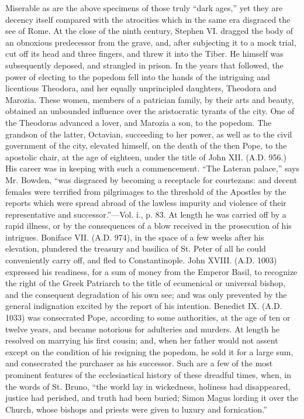 Miserable as are the above specimens of those
truly ``dark ages,'' yet they are decency itself compared with the
atrocities which in the same era disgraced the see of Rome. At the
close of the ninth century, Stephen VI. dragged the body of an
obnoxious predecessor from the grave, and, after subjecting it to a
mock trial, cut off its head and three fingers, and threw it into the
Tiber. He himself was subsequently deposed, and strangled in prison.
In the years that followed, the power of electing to the popedom fell
into the hands of the intriguing and licentious Theodora, and her
equally unprincipled daughters, Theodora and Marozia. These women,
members of a patrician family, by their arts and beauty, obtained an
unbounded influence over the aristocratic tyrants of the city. One of
the Theodoras advanced a lover, and Marozia a son, to the popedom. The
grandson of the latter, Octavian, succeeding to her power, as well as
to the civil government of the city, elevated himself, on the death of
the then Pope, to the apostolic chair, at the age of eighteen, under
the title of John XII. (A.D.
956.) His career was in keeping with such a commencement. ``The Lateran
palace,'' says Mr. Bowden, ``was disgraced by becoming a receptacle for
courtezans: and decent females were terrified from pilgrimages to the
threshold of the Apostles by the reports which were spread abroad
of the lawless impurity and violence of their representative and
successor.''—Vol. i., p. 83. At length he was carried off by a rapid
illness, or by the consequences of a blow received in the prosecution
of his intrigues. Boniface VII. (A.D.
974), in the space of a few weeks after his elevation, plundered the
treasury and basilica of St. Peter of all he could conveniently carry
off, and fled to Constantinople. John XVIII. (A.D.
1003) expressed his readiness, for a sum of money from the Emperor
Basil, to recognize the right of the Greek Patriarch to the title of
ecumenical or universal bishop, and the consequent degradation of his
own see; and was only prevented by the general indignation excited by
the report of his intention. Benedict IX. (A.D.
1033) was consecrated Pope, according to some authorities, at the age
of ten or twelve years, and became notorious for adulteries and
murders. At length he resolved on marrying his first cousin; and, when
her father would not assent except on the condition of his resigning
the popedom, he sold it for a large sum, and consecrated the purchaser
as his successor. Such are a few of the most prominent features of the
ecclesiastical history of these dreadful times, when, in the words of
St. Bruno, ``the world lay in wickedness, holiness had disappeared,
justice had perished, and truth had been buried; Simon Magus lording
it over the Church, whose bishops and priests were given to luxury and
fornication.''

